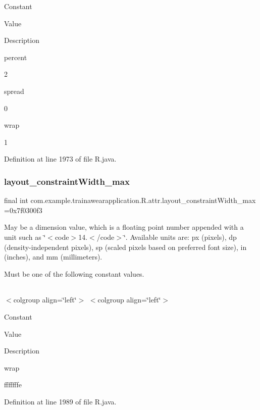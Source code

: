 Constant

Value

Description 

percent

2

spread

0

wrap

1

Definition at line 1973 of file R.\+java.

\mbox{\label{classcom_1_1example_1_1trainawearapplication_1_1_r_1_1attr_a3f1498b07684ab907829f631288f4da8}} 
\subsubsection{\texorpdfstring{layout\_constraintWidth\_max}{layout\_constraintWidth\_max}}
{\footnotesize\ttfamily final int com.\+example.\+trainawearapplication.\+R.\+attr.\+layout\+\_\+constraint\+Width\+\_\+max =0x7f0300f3\hspace{0.3cm}{\ttfamily [static]}}

May be a dimension value, which is a floating point number appended with a unit such as \char`\"{}$<$code$>$14.\+5sp$<$/code$>$\char`\"{}. Available units are\+: px (pixels), dp (density-\/independent pixels), sp (scaled pixels based on preferred font size), in (inches), and mm (millimeters). 

Must be one of the following constant values.

\tabulinesep=1mm
\begin{longtabu}spread 0pt [c]{*{0}{|X[-1]}|}
\hline
\end{longtabu}
$<$colgroup align=\char`\"{}left\char`\"{}$>$ $<$colgroup align=\char`\"{}left\char`\"{}$>$ 

Constant

Value

Description 

wrap

fffffffe

Definition at line 1989 of file R.\+java.

\mbox{\label{classcom_1_1example_1_1trainawearapplication_1_1_r_1_1attr_a8f6b8b1dfa9da5b3b785aca470ae8cdb}} 
